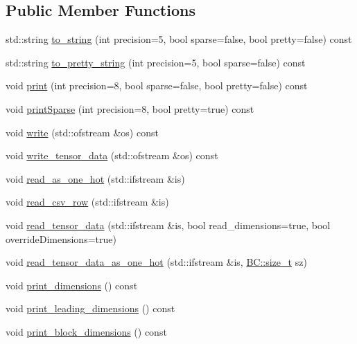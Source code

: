 \subsection*{Public Member Functions}
\begin{DoxyCompactItemize}
\item 
std\+::string \hyperlink{structBC_1_1tensors_1_1Tensor__Utility_a3202a6c237d7657367d8c4750bf9fc37}{to\+\_\+string} (int precision=5, bool sparse=false, bool pretty=false) const 
\item 
std\+::string \hyperlink{structBC_1_1tensors_1_1Tensor__Utility_a01052a3274a80a252743aa6bfe74dcbe}{to\+\_\+pretty\+\_\+string} (int precision=5, bool sparse=false) const 
\item 
void \hyperlink{structBC_1_1tensors_1_1Tensor__Utility_a6c5af9542ac1800075d811450c3c6e8b}{print} (int precision=8, bool sparse=false, bool pretty=false) const 
\item 
void \hyperlink{structBC_1_1tensors_1_1Tensor__Utility_a68f9cdcb723efb6288e3cea1501f9021}{print\+Sparse} (int precision=8, bool pretty=true) const 
\item 
void \hyperlink{structBC_1_1tensors_1_1Tensor__Utility_a4ce9623fc490c0c996bb377cf79ed033}{write} (std\+::ofstream \&os) const 
\item 
void \hyperlink{structBC_1_1tensors_1_1Tensor__Utility_a14e7f9e594c1c54f5b11b6b5c598947c}{write\+\_\+tensor\+\_\+data} (std\+::ofstream \&os) const 
\item 
void \hyperlink{structBC_1_1tensors_1_1Tensor__Utility_a28ca9005e5a5817579f027aaf4e1d180}{read\+\_\+as\+\_\+one\+\_\+hot} (std\+::ifstream \&is)
\item 
void \hyperlink{structBC_1_1tensors_1_1Tensor__Utility_a7a5b71809ca307bb1ec15fefcb3c40b3}{read\+\_\+csv\+\_\+row} (std\+::ifstream \&is)
\item 
void \hyperlink{structBC_1_1tensors_1_1Tensor__Utility_af969b8b30323ba40d4ee8595866a9c13}{read\+\_\+tensor\+\_\+data} (std\+::ifstream \&is, bool read\+\_\+dimensions=true, bool override\+Dimensions=true)
\item 
void \hyperlink{structBC_1_1tensors_1_1Tensor__Utility_a4bdfca850f646b3ca5f5acb9951cfd54}{read\+\_\+tensor\+\_\+data\+\_\+as\+\_\+one\+\_\+hot} (std\+::ifstream \&is, \hyperlink{namespaceBC_a6007cbc4eeec401a037b558910a56173}{B\+C\+::size\+\_\+t} sz)
\item 
void \hyperlink{structBC_1_1tensors_1_1Tensor__Utility_a4a90e2584e698bccf99047ad7b28eb50}{print\+\_\+dimensions} () const 
\item 
void \hyperlink{structBC_1_1tensors_1_1Tensor__Utility_adc6c8e93d9c896bce34a40910162c19a}{print\+\_\+leading\+\_\+dimensions} () const 
\item 
void \hyperlink{structBC_1_1tensors_1_1Tensor__Utility_a9fedd9cc3f5dff6916b33abee051dfa9}{print\+\_\+block\+\_\+dimensions} () const 
\end{DoxyCompactItemize}
